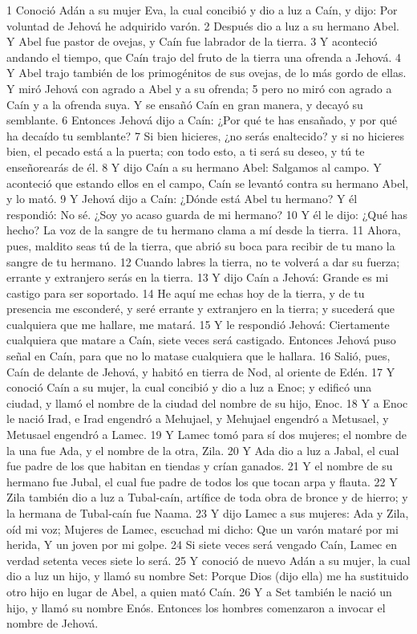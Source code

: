 1 Conoció Adán a su mujer Eva, la cual concibió y dio a luz a Caín, y dijo: Por voluntad de Jehová he adquirido varón.
2 Después dio a luz a su hermano Abel. Y Abel fue pastor de ovejas, y Caín fue labrador de la tierra.
3 Y aconteció andando el tiempo, que Caín trajo del fruto de la tierra una ofrenda a Jehová.
4 Y Abel trajo también de los primogénitos de sus ovejas, de lo más gordo de ellas. Y miró Jehová con agrado a Abel y a su ofrenda;
5 pero no miró con agrado a Caín y a la ofrenda suya. Y se ensañó Caín en gran manera, y decayó su semblante.
6 Entonces Jehová dijo a Caín: ¿Por qué te has ensañado, y por qué ha decaído tu semblante?
7 Si bien hicieres, ¿no serás enaltecido? y si no hicieres bien, el pecado está a la puerta; con todo esto, a ti será su deseo, y tú te enseñorearás de él.
8 Y dijo Caín a su hermano Abel: Salgamos al campo. Y aconteció que estando ellos en el campo, Caín se levantó contra su hermano Abel, y lo mató.
9 Y Jehová dijo a Caín: ¿Dónde está Abel tu hermano? Y él respondió: No sé. ¿Soy yo acaso guarda de mi hermano?
10 Y él le dijo: ¿Qué has hecho? La voz de la sangre de tu hermano clama a mí desde la tierra.
11 Ahora, pues, maldito seas tú de la tierra, que abrió su boca para recibir de tu mano la sangre de tu hermano.
12 Cuando labres la tierra, no te volverá a dar su fuerza; errante y extranjero serás en la tierra.
13 Y dijo Caín a Jehová: Grande es mi castigo para ser soportado.
14 He aquí me echas hoy de la tierra, y de tu presencia me esconderé, y seré errante y extranjero en la tierra; y sucederá que cualquiera que me hallare, me matará.
15 Y le respondió Jehová: Ciertamente cualquiera que matare a Caín, siete veces será castigado. Entonces Jehová puso señal en Caín, para que no lo matase cualquiera que le hallara.
16 Salió, pues, Caín de delante de Jehová, y habitó en tierra de Nod, al oriente de Edén.
17 Y conoció Caín a su mujer, la cual concibió y dio a luz a Enoc; y edificó una ciudad, y llamó el nombre de la ciudad del nombre de su hijo, Enoc.
18 Y a Enoc le nació Irad, e Irad engendró a Mehujael, y Mehujael engendró a Metusael, y Metusael engendró a Lamec.
19 Y Lamec tomó para sí dos mujeres; el nombre de la una fue Ada, y el nombre de la otra, Zila.
20 Y Ada dio a luz a Jabal, el cual fue padre de los que habitan en tiendas y crían ganados.
21 Y el nombre de su hermano fue Jubal, el cual fue padre de todos los que tocan arpa y flauta.
22 Y Zila también dio a luz a Tubal-caín, artífice de toda obra de bronce y de hierro; y la hermana de Tubal-caín fue Naama.
23 Y dijo Lamec a sus mujeres:
    Ada y Zila, oíd mi voz;
    Mujeres de Lamec, escuchad mi dicho:
    Que un varón mataré por mi herida,
    Y un joven por mi golpe.
24 Si siete veces será vengado Caín,
Lamec en verdad setenta veces siete lo será.
25 Y conoció de nuevo Adán a su mujer, la cual dio a luz un hijo, y llamó su nombre Set: Porque Dios (dijo ella) me ha sustituido otro hijo en lugar de Abel, a quien mató Caín.
26 Y a Set también le nació un hijo, y llamó su nombre Enós. Entonces los hombres comenzaron a invocar el nombre de Jehová.

